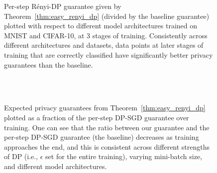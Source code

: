 \begin{figure}[t]
\centering
{}
\caption{Per-step R\'enyi-DP guarantee given by Theorem~\ref{thm:easy_renyi_dp} (divided by the baseline guarantee) plotted with respect to different model architectures trained on MNIST and CIFAR-10, at 3 stages of training. Consistently across different architectures and datasets, data points at later stages of training that are correctly classified have significantly better privacy guarantees than the baseline.
}
\label{fig:renyi_simple_fraction_curve_vary_arch_mnist}
\end{figure}

\begin{figure}[t]
\centering
{}
\\
\\
\caption{Expected privacy guarantees from Theorem~\ref{thm:easy_renyi_dp} plotted as a fraction of the per-step DP-SGD guarantee over training. One can see that the ratio between our guarantee and the per-step DP-SGD guarantee (the baseline) decreases as training approaches the end, and this is consistent across different strengths of DP (i.e., $\epsilon$ set for the entire training), varying mini-batch size, and different model architectures.
}
\label{fig:renyi_simple_composition_mnist_sum}
\end{figure}

